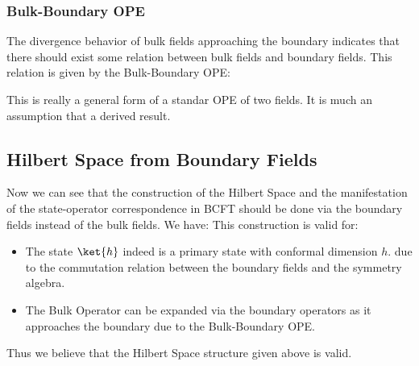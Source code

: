 \subsubsection{Bulk-Boundary OPE}

The divergence behavior of bulk fields approaching the boundary
indicates that there should exist some relation between bulk fields
and boundary fields. This relation is given by the Bulk-Boundary OPE:

This is really a general form of a standar OPE of two fields. It is
much an assumption that a derived result.

\subsection{Hilbert Space from Boundary Fields}

Now we can see that the construction of the Hilbert Space and the
manifestation of the state-operator correspondence in BCFT should be
done via the boundary fields instead of the bulk fields. We have:
This construction is valid for:
\begin{itemize}
  \item The state $ \ket{h} $ indeed is a primary state with
    conformal dimension $ h $. due to the commutation relation
    between the boundary fields and the symmetry algebra.
  \item The Bulk Operator can be expanded via the boundary operators
    as it approaches the boundary due to the Bulk-Boundary OPE.
\end{itemize}
Thus we believe that the Hilbert Space structure given above is valid.

